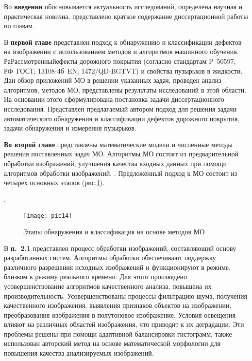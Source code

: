 Во \textbf{введении} обосновывается актуальность исследований, определена научная и практическая новизна, представлено краткое содержание диссертационной работы по главам.

В \textbf {первой главе} представлен подход к обнаружению и классификации дефектов на изображении с использованием методов и алгоритмов машинного обучения. РаРассмотренныйефекты дорожного покрытия (согласно стандартам P~50597, РФ~ГОСТ; 13108-4б~EN; 1472/QD-BGTVT) и свойства пузырьков в жидкости. Дан обзор приложений МО в решении указанных задач, проведен анализ алгоритмов, методов МО, представлены результаты исследований в этой области. На основании этого сформулирована постановка задачи диссертационного исследования. Представлен предлагаемый автором подход для решения задачи автоматического обнаружения и классификации дефектов дорожного покрытия, задачи обнаружения и измерения пузырьков.

 \textbf{Во второй главе} представлены математические модели и численные методы решения поставленных задач МО. Алгоритмы МО состоят из предварительной обработки изображений, улучшения качества входных данных при помощи алгоритмов обработки изображений, . Предложенный подход к МО состоит из четырех основных этапов (рис.\ref{pic14}).

, 

\begin{figure}[ht!]
\centering
\texttt{[image: pic14]}
\caption{Этапы обнаружения и классификация на основе методов МО}
	\label{pic14}
	\end{figure}


В \textbf{п.~2.1} представлен процесс обработки изображений, составляющий основу разработанных систем. Алгоритмы обработки обеспечивают поддержку различного разрешения исходных изображений и функционируют в режиме, близком к режиму реального времени. Для этого произведено усовершенствование алгоритмов качественного анализа, повышена их производительность. Усовершенствованы процессы фильтрацию шума, получения качественного изображения, выявления признаков объектов на изображении, преобразования изображения в полутоновое изображение. Условия освещения  влияют на  различных областей изображения, что приводит к их деградации. Эти проблемы решены при помощи адаптивной балансировки гистограмм, также использован авторский метод на основе математической морфологии для повышения качества анализируемых изображений.

